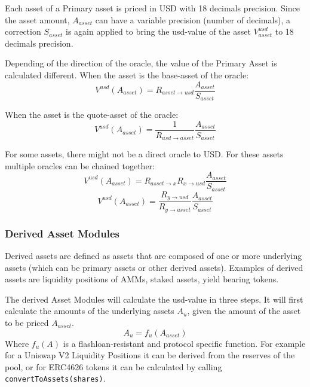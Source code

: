 \documentclass[sigconf,nonacm]{acmart}
\begin{document}
Each asset of a Primary asset is priced in USD with 18 decimals precision.
Since the asset amount, $A_{asset}$ can have a variable precision (number of decimals), a correction $S_{asset}$ is again applied to bring the usd-value of the asset $V_{asset}^{usd}$ to 18 decimals precision.

Depending of the direction of the oracle, the value of the Primary Asset is calculated different.
When the asset is the base-asset of the oracle:
\begin{equation}
    V^{usd}(A_{asset}) = R_{asset\rightarrow usd} \frac{A_{asset}}{S_{asset}}
\end{equation}

When the asset is the quote-asset of the oracle:
\begin{equation}
    V^{usd}(A_{asset}) = \frac{1}{R_{usd\rightarrow asset}} \frac{A_{asset}}{S_{asset}}
\end{equation}

For some assets, there might not be a direct oracle to USD.
For these assets multiple oracles can be chained together:
\begin{equation}
    V^{usd}(A_{asset}) = R_{asset\rightarrow x} R_{x\rightarrow usd} \frac{A_{asset}}{S_{asset}}
\end{equation}
\begin{equation}
    V^{usd}(A_{asset}) = \frac{R_{y\rightarrow usd}}{R_{y\rightarrow asset}} \frac{A_{asset}}{S_{asset}}
\end{equation}

\subsubsection{Derived Asset Modules}
Derived assets are defined as assets that are composed of one or more underlying assets (which can be primary assets or other derived assets).
Examples of derived assets are liquidity positions of AMMs, staked assets, yield bearing tokens.

The derived Asset Modules will calculate the usd-value in three steps.
It will first calculate the amounts of the underlying assets $A_{u}$, given the amount of the asset to be priced $A_{asset}$.
\begin{equation}
    \label{eq:underlying-asset-amounts}
    A_{u} = f_{u}(A_{asset})
\end{equation}
Where $f_{u}(A)$ is a flashloan-resistant and protocol specific function.
For example for a Uniswap V2 Liquidity Positions it can be derived from the reserves of the pool,
or for ERC4626 tokens it can be calculated by calling \texttt{convertToAssets(shares)}.
\end{document}
